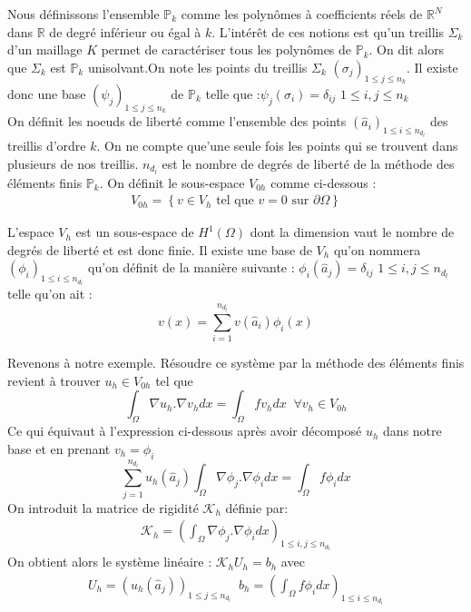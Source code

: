 Nous définissons l'ensemble $\mathbb{P}_{k}$ comme les polynômes à coefficients réels de $\mathbb{R}^{N}$ dans $\mathbb{R}$ de degré inférieur ou égal à $k$. L'intérêt de ces notions est qu'un treillis $\Sigma_{k}$ d'un maillage $K$ permet de caractériser tous les polynômes de $\mathbb{P}_{k}$. On dit alors que $\Sigma_{k}$ est $\mathbb{P}_{k}$ unisolvant.On note les points du treillis $\Sigma_{k}$  $\left(\sigma_{j}\right)_{1\leq j\leq n_{k}}$. Il existe donc une base $\left(\psi_{j}\right)_{1\leq j\leq n_{k}}$ de $\mathbb{P}_{k}$ telle que :$\psi_{j}\left(\sigma_{i}\right)=\delta_{ij}$  $1\leq i, j\leq n_{k}$\\

On définit les noeuds de liberté comme l'ensemble des points $\left(\hat{a}_{i}\right)_{1\leq i\leq n_{d_{l}}}$ des treillis d'ordre $k$. On ne compte que'une seule fois les points qui se trouvent dans plusieurs de nos treillis. $n_{d_{l}}$ est le nombre de degrés de liberté de la méthode des éléments finis $\mathbb{P}_{k}$. On définit le sous-espace $V_{0h}$ comme ci-dessous :\\
\begin{align*}
V_{0h}=\left\{v\in V_{h} \text{ tel que } v=0 \text{ sur } \partial\Omega\right\}
\end{align*}

L'espace $V_{h}$  est un sous-espace de $H^{1}\left(\Omega\right)$ dont la dimension vaut le nombre de degrés de liberté et est donc finie. Il existe une base de $V_{h}$ qu'on nommera $\left(\phi_{i}\right)_{1\leq i\leq n_{d_{l}}}$ qu'on définit de la manière suivante : $\phi_{i}\left(\hat{a}_{j}\right)=\delta_{ij}$  $1\leq i, j\leq n_{d_{l}}$ telle qu'on ait :
\begin{equation*}
v(x)=\sum_{i=1}^{n_{d_{l}}}v\left(\hat{a}_{i}\right)\phi_{i}\left(x\right)
\end{equation*}

Revenons à notre exemple. Résoudre ce système par la méthode des éléments finis revient à trouver $u_{h}\in V_{0h}$ tel que
\begin{equation*}
\int_{\Omega}\nabla u_{h}.\nabla v_{h}dx=\int_{\Omega}fv_{h}dx \;\; \forall v_{h}\in V_{0h}
\end{equation*}
Ce qui équivaut à l'expression ci-dessous après avoir décomposé $u_h$ dans notre base et en prenant $v_{h}=\phi_{i}$
\begin{equation*}
\sum_{j=1}^{n_{d_{l}}}u_h\left(\hat{a}_{j}\right)\int_{\Omega}\nabla\phi_{j}.\nabla\phi_{i}dx=\int_{\Omega}f\phi_{i}dx
\end{equation*}
On introduit la matrice de rigidité $\mathcal{K}_{h}$ définie par:
\begin{align*}
\mathcal{K}_{h}=\left(\int_{\Omega}\nabla\phi_{j}.\nabla\phi_{i} dx\right)_{1\leq i, j\leq n_{d_{l}}}
\end{align*}
On obtient alors le système linéaire : $\mathcal{K}_{h}U_{h}=b_{h}$ avec
\begin{align*}
U_{h}=\left(u_{h}\left(\hat{a}_{j}\right)\right)_{1\leq j \leq n_{d_{l}}} \;\; b_{h}=\left(\int_{\Omega}f\phi_{i}dx\right)_{1\leq i\leq n_{d_{l}}}
\end{align*}
